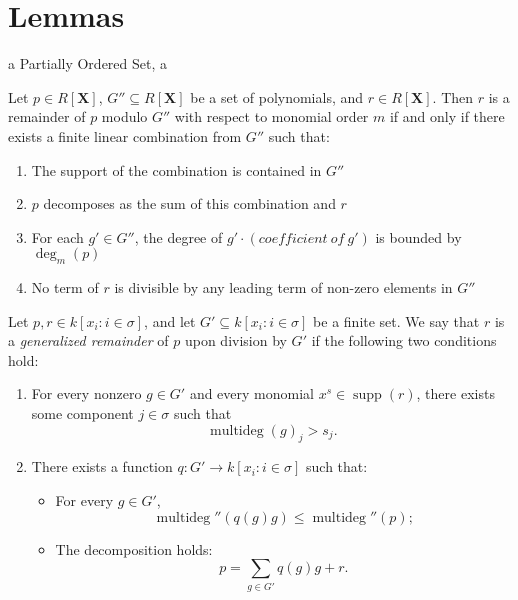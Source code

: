     \chapter{Lemmas}
    
        \begin{lemma}\label{zero_le}
          
          \leanok
          a \in Partially Ordered Set, a 

        \end{lemma}

        \begin{lemma}\label{IsRemainder_def'}
          \leanok
          Let $p \in R[\mathbf{X}]$, $G'' \subseteq R[\mathbf{X}]$ be a set of polynomials,
and $r \in R[\mathbf{X}]$. Then $r$ is a remainder of $p$ modulo $G''$ with respect to
monomial order $m$ if and only if there exists a finite linear combination from $G''$
such that:
\begin{enumerate}
  \item The support of the combination is contained in $G''$
  \item $p$ decomposes as the sum of this combination and $r$
  \item For each $g' \in G''$, the degree of $g' \cdot (coefficient\ of\ g')$
        is bounded by $\deg_m(p)$
  \item No term of $r$ is divisible by any leading term of non-zero elements in $G''$
\end{enumerate}

        \end{lemma}

        \begin{lemma}\label{IsRemainder_def''}
          \leanok
          Let \( p, r \in k[x_i : i \in \sigma] \), and let \( G' \subseteq k[x_i : i \in \sigma] \) be a finite set.
We say that \( r \) is a \emph{generalized remainder} of \( p \) upon division by \( G' \) if the following two conditions hold:

\begin{enumerate}
  \item For every nonzero \( g \in G' \) and every monomial \( x^s \in \operatorname{supp}(r) \),
        there exists some component \( j \in \sigma \) such that
        \[
        \operatorname{multideg}(g)_j > s_j.
        \]
  \item There exists a function \( q : G' \to k[x_i : i \in \sigma] \) such that:
  \begin{itemize}
    \item For every \( g \in G' \),
          \[
          \operatorname{multideg}''(q(g)g) \leq \operatorname{multideg}''(p);
          \]
    \item The decomposition holds:
          \[
          p = \sum_{g \in G'} q(g)g + r.
          \]
  \end{itemize}
\end{enumerate}

        \end{lemma}

